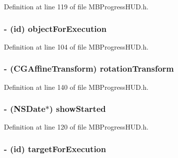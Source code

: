 Definition at line 119 of file MBProgressHUD.h.

\hypertarget{interface_m_b_progress_h_u_d_a8a5775046c2febf1bffd946f6febce85}{
\subsubsection[{objectForExecution}]{\setlength{\rightskip}{0pt plus 5cm}-\/ (id) {\bf objectForExecution}}}
\label{interface_m_b_progress_h_u_d_a8a5775046c2febf1bffd946f6febce85}


Definition at line 104 of file MBProgressHUD.h.

\hypertarget{interface_m_b_progress_h_u_d_adc611101946978c2d856725aee5f3268}{
\subsubsection[{rotationTransform}]{\setlength{\rightskip}{0pt plus 5cm}-\/ (CGAffineTransform) {\bf rotationTransform}}}
\label{interface_m_b_progress_h_u_d_adc611101946978c2d856725aee5f3268}


Definition at line 140 of file MBProgressHUD.h.

\hypertarget{interface_m_b_progress_h_u_d_aec6a7dafb64489e886976bac1d834c49}{
\subsubsection[{showStarted}]{\setlength{\rightskip}{0pt plus 5cm}-\/ (NSDate$\ast$) {\bf showStarted}}}
\label{interface_m_b_progress_h_u_d_aec6a7dafb64489e886976bac1d834c49}


Definition at line 120 of file MBProgressHUD.h.

\hypertarget{interface_m_b_progress_h_u_d_ac38a276e24f577d9c261e271f57a33c4}{
\subsubsection[{targetForExecution}]{\setlength{\rightskip}{0pt plus 5cm}-\/ (id) {\bf targetForExecution}}}
\label{interface_m_b_progress_h_u_d_ac38a276e24f577d9c261e271f57a33c4}


